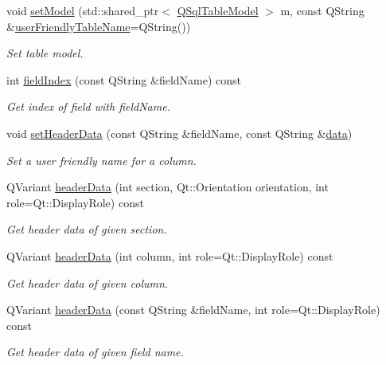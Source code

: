 \begin{DoxyCompactItemize}
void \hyperlink{classmdt_abstract_sql_table_controller_ac9e64cf30e552ec65ed5fdd861320676}{set\-Model} (std\-::shared\-\_\-ptr$<$ \hyperlink{class_q_sql_table_model}{Q\-Sql\-Table\-Model} $>$ m, const Q\-String \&\hyperlink{classmdt_abstract_sql_table_controller_a1a9b3d3e4009acd32fc4a083f738fc62}{user\-Friendly\-Table\-Name}=Q\-String())
\begin{DoxyCompactList}\small\item\em Set table model. \end{DoxyCompactList}\item 
int \hyperlink{classmdt_abstract_sql_table_controller_a8cdca2d31b1129caa20cf5a0e583f068}{field\-Index} (const Q\-String \&field\-Name) const 
\begin{DoxyCompactList}\small\item\em Get index of field with field\-Name. \end{DoxyCompactList}\item 
void \hyperlink{classmdt_abstract_sql_table_controller_a21621bf5eb35b430c8bfd1b1c5ad7607}{set\-Header\-Data} (const Q\-String \&field\-Name, const Q\-String \&\hyperlink{classmdt_abstract_sql_table_controller_a1801a01c0ce073c2e389b20f58a3d3ff}{data})
\begin{DoxyCompactList}\small\item\em Set a user friendly name for a column. \end{DoxyCompactList}\item 
Q\-Variant \hyperlink{classmdt_abstract_sql_table_controller_a904e6bdf3a69e755ee9fd2239bea576f}{header\-Data} (int section, Qt\-::\-Orientation orientation, int role=Qt\-::\-Display\-Role) const 
\begin{DoxyCompactList}\small\item\em Get header data of given section. \end{DoxyCompactList}\item 
Q\-Variant \hyperlink{classmdt_abstract_sql_table_controller_aae2c2912d99d33e6e0e3b010d218007f}{header\-Data} (int column, int role=Qt\-::\-Display\-Role) const 
\begin{DoxyCompactList}\small\item\em Get header data of given column. \end{DoxyCompactList}\item 
Q\-Variant \hyperlink{classmdt_abstract_sql_table_controller_a9b022656604a245f4517ed3a8df1ac37}{header\-Data} (const Q\-String \&field\-Name, int role=Qt\-::\-Display\-Role) const 
\begin{DoxyCompactList}\small\item\em Get header data of given field name. \end{DoxyCompactList}\item 

\end{DoxyCompactItemize}
